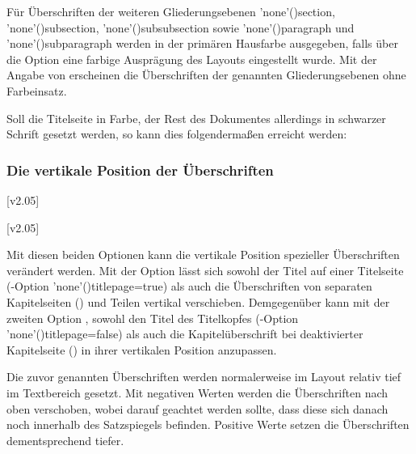 \begin{DeclareEntity*}{}
\begin{DeclareEntity*}{}
\begin{DeclareEntity*}{}
\begin{Declaration}
Für Überschriften der weiteren Gliederungsebenen
\Macro'none'(){section}, 
\Macro'none'(){subsection}, 
\Macro'none'(){subsubsection} sowie 
\Macro'none'(){paragraph} und 
\Macro'none'(){subparagraph}
werden in der primären Hausfarbe  ausgegeben, falls über die 
Option  eine farbige Ausprägung des Layouts eingestellt wurde.
Mit der Angabe von  erscheinen die Überschriften der 
genannten Gliederungsebenen ohne Farbeinsatz.%
\end{Declaration}
%
\begin{Example}
Soll die Titelseite in Farbe, der Rest des Dokumentes allerdings in schwarzer 
Schrift gesetzt werden, so kann dies folgendermaßen erreicht werden:
\end{Example}
%



\subsubsection{Die vertikale Position der Überschriften}

\begin{Declaration}
  {}
  [v2.05]
\begin{Declaration}
  {}
  [v2.05]
\printdeclarationlist

Mit diesen beiden Optionen kann die vertikale Position spezieller Überschriften 
verändert werden. Mit der Option  lässt sich sowohl 
der Titel auf einer Titelseite 
(\KOMAScript-Option \Option'none'(){titlepage=true}) als 
auch die Überschriften von separaten Kapitelseiten () 
und Teilen vertikal verschieben. Demgegenüber kann mit der zweiten Option 
, sowohl den Titel des Titelkopfes 
(\KOMAScript-Option \Option'none'(){titlepage=false}) als 
auch die Kapitelüberschrift bei deaktivierter Kapitelseite 
() in ihrer vertikalen Position anzupassen.

Die zuvor genannten Überschriften werden normalerweise im Layout relativ tief 
im Textbereich gesetzt. Mit negativen Werten werden die Überschriften nach oben 
verschoben, wobei darauf geachtet werden sollte, dass diese sich danach noch 
innerhalb des Satzspiegels befinden. Positive Werte setzen die Überschriften 
dementsprechend tiefer.%
\end{Declaration}
\end{Declaration}
%




\end{DeclareEntity*}
\end{DeclareEntity*}
\end{DeclareEntity*}

